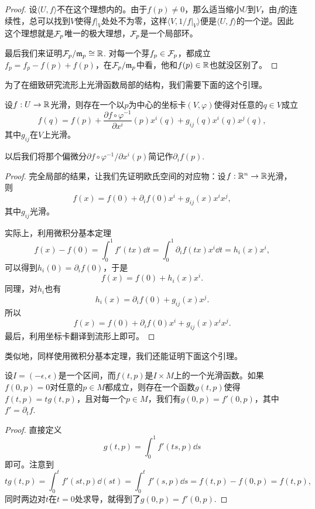 \begin{proof}
设$\langle U,f\rangle$不在这个理想内的。由于$f(p)\neq 0$，那么适当缩小$U$到$V$，由$f$的连续性，总可以找到$V$使得$f|_V$处处不为零，这样$\langle V,1/f|_V\rangle$便是$\langle U,f\rangle$的一个逆。因此这个理想就是$\mathcal{F}_p$唯一的极大理想，$\mathcal{F}_p$是一个局部环。

最后我们来证明$\mathcal{F}_p/\mathfrak{m}_p\cong \mathbb{R}$. 对每一个芽$f_p\in\mathcal{F}_p$，都成立$f_p=f_p-f(p)+f(p)$，在$\mathcal{F}_p/\mathfrak{m}_p$中看，他和$f(p)\in\mathbb{R}$也就没区别了。
\end{proof}

为了在细致研究流形上光滑函数局部的结构，我们需要下面的这个引理。

\begin{lem}\label{lem:1.1.5}
设$f:U\to \mathbb{R}$光滑，则存在一个以$p$为中心的坐标卡$(V,\varphi)$使得对任意的$q\in V$成立
\[
	f(q)=f(p)+\frac{\partial f\circ \varphi^{-1}}{\partial x^i}(p)x^i(q)+g_{ij}(q)x^i(q)x^j(q),
\]
其中$g_{ij}$在$V$上光滑。
\end{lem}

以后我们将那个偏微分$\partial f\circ \varphi^{-1}/\partial x^i (p)$简记作$\partial_i f(p)$.

\begin{proof}
完全局部的结果，让我们先证明欧氏空间的对应物：设$f:\mathbb{R}^n\to \mathbb{R}$光滑，则
\[
	f(x)=f(0)+\partial_if(0)x^i+g_{ij}(x)x^ix^j,
\]
其中$g_{ij}$光滑。

实际上，利用微积分基本定理
\[
	f(x)-f(0)=\int_0^1f'(tx)\dd t=\int_0^1\partial_i f(tx)x^i\dd t=h_i(x)x^i,
\]
可以得到$h_i(0)=\partial_i f(0)$，于是
\[
	f(x)=f(0)+h_i(x)x^i.
\]
同理，对$h_i$也有
\[
	h_i(x)=\partial_i f(0)+g_{ij}(x)x^j.
\]
所以
\[
	f(x)=f(0)+\partial_i f(0)x^i+g_{ij}(x)x^ix^j.
\]
最后，利用坐标卡翻译到流形上即可。
\end{proof}

类似地，同样使用微积分基本定理，我们还能证明下面这个引理。

\begin{lem}\label{lem:1.5}
设$I=(-\epsilon,\epsilon)$是一个区间，而$f(t,p)$是$I\times M$上的一个光滑函数。如果$f(0,p)=0$对任意的$p\in M$都成立，则存在一个函数$g(t,p)$使得$f(t,p)=tg(t,p)$，且对每一个$p\in M$，我们有$g(0,p)=f'(0,p)$，其中$f'=\partial_t f$.
\end{lem}

\begin{proof}
	直接定义
	\[
	g(t,p)=\int_0^1 f'(ts,p)\dd s
	\]
	即可。注意到
	\[
	tg(t,p)=\int_0^tf'(st,p)\dd (st)=\int_0^tf'(s,p)\dd s=f(t,p)-f(0,p)=f(t,p),
	\]
	同时两边对$t$在$t=0$处求导，就得到了$g(0,p)=f'(0,p)$.
\end{proof}

